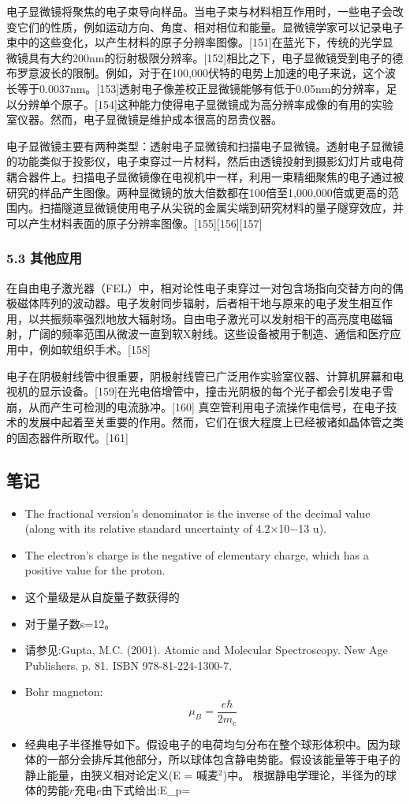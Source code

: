 电子显微镜将聚焦的电子束导向样品。当电子束与材料相互作用时，一些电子会改变它们的性质，例如运动方向、角度、相对相位和能量。显微镜学家可以记录电子束中的这些变化，以产生材料的原子分辨率图像。[151]在蓝光下，传统的光学显微镜具有大约200nm的衍射极限分辨率。[152]相比之下，电子显微镜受到电子的德布罗意波长的限制。例如，对于在100,000伏特的电势上加速的电子来说，这个波长等于0.0037nm。[153]透射电子像差校正显微镜能够有低于0.05nm的分辨率，足以分辨单个原子。[154]这种能力使得电子显微镜成为高分辨率成像的有用的实验室仪器。然而，电子显微镜是维护成本很高的昂贵仪器。

电子显微镜主要有两种类型：透射电子显微镜和扫描电子显微镜。透射电子显微镜的功能类似于投影仪，电子束穿过一片材料，然后由透镜投射到摄影幻灯片或电荷耦合器件上。扫描电子显微镜像在电视机中一样，利用一束精细聚焦的电子通过被研究的样品产生图像。两种显微镜的放大倍数都在100倍至1,000,000倍或更高的范围内。扫描隧道显微镜使用电子从尖锐的金属尖端到研究材料的量子隧穿效应，并可以产生材料表面的原子分辨率图像。[155][156][157]
\subsubsection{5.3 其他应用}
在自由电子激光器（FEL）中，相对论性电子束穿过一对包含场指向交替方向的偶极磁体阵列的波动器。电子发射同步辐射，后者相干地与原来的电子发生相互作用，以共振频率强烈地放大辐射场。自由电子激光可以发射相干的高亮度电磁辐射，广阔的频率范围从微波一直到软X射线。这些设备被用于制造、通信和医疗应用中，例如软组织手术。[158]

电子在阴极射线管中很重要，阴极射线管已广泛用作实验室仪器、计算机屏幕和电视机的显示设备。[159]在光电倍增管中，撞击光阴极的每个光子都会引发电子雪崩，从而产生可检测的电流脉冲。[160] 真空管利用电子流操作电信号，在电子技术的发展中起着至关重要的作用。然而，它们在很大程度上已经被诸如晶体管之类的固态器件所取代。[161]

\subsection{笔记}
\begin{itemize}
\item The fractional version's denominator is the inverse of the decimal value (along with its relative standard uncertainty of 4.2×10−13 u).
\item The electron's charge is the negative of elementary charge, which has a positive value for the proton.
\item 这个量级是从自旋量子数获得的
\item 对于量子数s=12。
\item 请参见:Gupta, M.C. (2001). Atomic and Molecular Spectroscopy. New Age Publishers. p. 81. ISBN 978-81-224-1300-7.
\item Bohr magneton:$$\mu_B=\frac{e\hbar}{2m_e}~$$
\item 经典电子半径推导如下。假设电子的电荷均匀分布在整个球形体积中。因为球体的一部分会排斥其他部分，所以球体包含静电势能。假设该能量等于电子的静止能量，由狭义相对论定义(E = 喊麦$^2$)中。
根据静电学理论，半径为的球体的势能$r$充电$e$由下式给出:$$E_p=~
\end{itemize}

